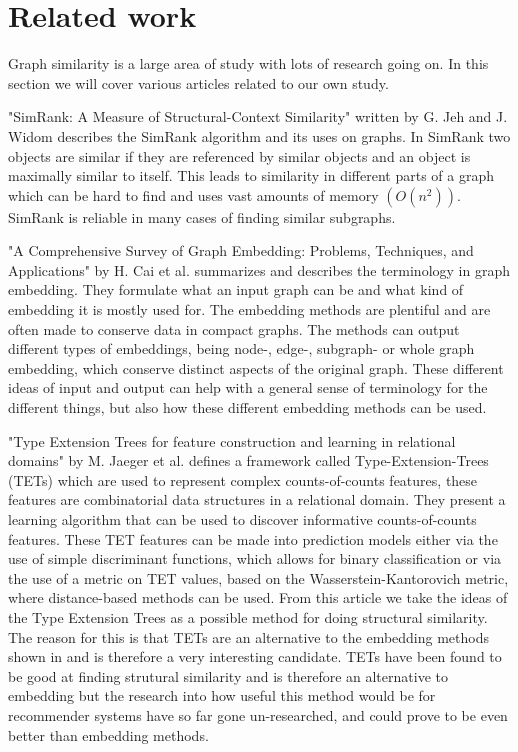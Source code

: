 \section{Related work}
\label{sec:Related_work}
Graph similarity is a large area of study with lots of research going on. In this section we will cover various articles related to our own study.

"SimRank: A Measure of Structural-Context Similarity" written by G. Jeh and J. Widom\cite{10.1145/775047.775126} describes the SimRank algorithm and its uses on graphs. 
In SimRank two objects are similar if they are referenced by similar objects and an object is maximally similar to itself. 
This leads to similarity in different parts of a graph which can be hard to find and uses vast amounts of memory $(O(n^2))$. SimRank is reliable in many cases of finding similar subgraphs.

"A Comprehensive Survey of Graph Embedding: Problems, Techniques, and Applications" by H. Cai et al.\cite{8294302} summarizes and describes the terminology in graph embedding. 
They formulate what an input graph can be and what kind of embedding it is mostly used for.
 The embedding methods are plentiful and are often made to conserve data in compact graphs. 
The methods can output different types of embeddings, being node-, edge-, subgraph- or whole graph embedding, which conserve distinct aspects of the original graph. 
These different ideas of input and output can help with a general sense of terminology for the different things, but also how these different embedding methods can be used.

"Type Extension Trees for feature construction and learning in relational domains" by M. Jaeger et al. \cite{JAEGER201330} defines a framework called Type-Extension-Trees (TETs) which are used to represent complex counts-of-counts features, these features are combinatorial data structures in a relational domain. 
They present a learning algorithm that can be used to discover informative counts-of-counts features. 
These TET features can be made into prediction models either via the use of simple discriminant functions, which allows for binary classification or via the use of a metric on TET values, based on the Wasserstein-Kantorovich metric, where distance-based methods can be used. From this article we take the ideas of the Type Extension Trees as a possible method for doing structural similarity.
The reason for this is that TETs are an alternative to the embedding methods shown in \cite{8294302} and is therefore a very interesting candidate. 
TETs have been found to be good at finding strutural similarity and is therefore an alternative to embedding but the research into how useful this method would be for recommender systems have so far gone un-researched, and could prove to be even better than embedding methods.

